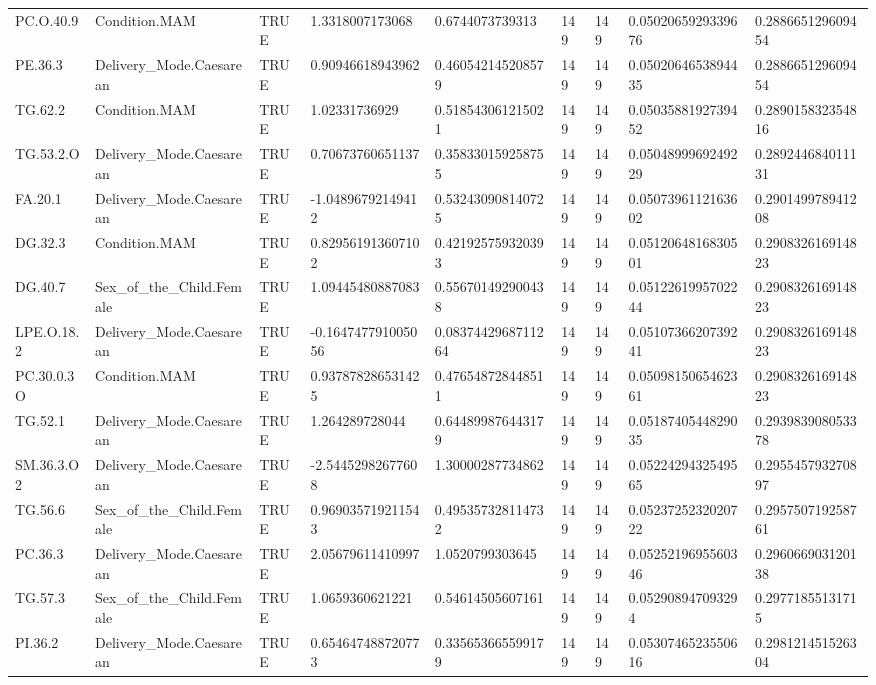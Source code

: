 \begin{longtable}{lllllllll}
PC.O.40.9 & Condition.MAM & TRUE & 1.3318007173068 & 0.6744073739313 & 149 & 149 & 0.0502065929339676 & 0.288665129609454 \\
PE.36.3 & Delivery\_Mode.Caesarean & TRUE & 0.90946618943962 & 0.460542145208579 & 149 & 149 & 0.0502064653894435 & 0.288665129609454 \\
TG.62.2 & Condition.MAM & TRUE & 1.02331736929 & 0.518543061215021 & 149 & 149 & 0.0503588192739452 & 0.289015832354816 \\
TG.53.2.O & Delivery\_Mode.Caesarean & TRUE & 0.70673760651137 & 0.358330159258755 & 149 & 149 & 0.0504899969249229 & 0.289244684011131 \\
FA.20.1 & Delivery\_Mode.Caesarean & TRUE & -1.04896792149412 & 0.532430908140725 & 149 & 149 & 0.0507396112163602 & 0.290149978941208 \\
DG.32.3 & Condition.MAM & TRUE & 0.829561913607102 & 0.421925759320393 & 149 & 149 & 0.0512064816830501 & 0.290832616914823 \\
DG.40.7 & Sex\_of\_the\_Child.Female & TRUE & 1.09445480887083 & 0.556701492900438 & 149 & 149 & 0.0512261995702244 & 0.290832616914823 \\
LPE.O.18.2 & Delivery\_Mode.Caesarean & TRUE & -0.164747791005056 & 0.0837442968711264 & 149 & 149 & 0.0510736620739241 & 0.290832616914823 \\
PC.30.0.3O & Condition.MAM & TRUE & 0.937878286531425 & 0.476548728448511 & 149 & 149 & 0.0509815065462361 & 0.290832616914823 \\
TG.52.1 & Delivery\_Mode.Caesarean & TRUE & 1.264289728044 & 0.644899876443179 & 149 & 149 & 0.0518740544829035 & 0.293983908053378 \\
SM.36.3.O2 & Delivery\_Mode.Caesarean & TRUE & -2.54452982677608 & 1.30000287734862 & 149 & 149 & 0.0522429432549565 & 0.295545793270897 \\
TG.56.6 & Sex\_of\_the\_Child.Female & TRUE & 0.969035719211543 & 0.495357328114732 & 149 & 149 & 0.0523725232020722 & 0.295750719258761 \\
PC.36.3 & Delivery\_Mode.Caesarean & TRUE & 2.05679611410997 & 1.0520799303645 & 149 & 149 & 0.0525219695560346 & 0.296066903120138 \\
TG.57.3 & Sex\_of\_the\_Child.Female & TRUE & 1.0659360621221 & 0.54614505607161 & 149 & 149 & 0.052908947093294 & 0.29771855131715 \\
PI.36.2 & Delivery\_Mode.Caesarean & TRUE & 0.654647488720773 & 0.335653665599179 & 149 & 149 & 0.0530746523550616 & 0.298121451526304 \\

\end{longtable}
